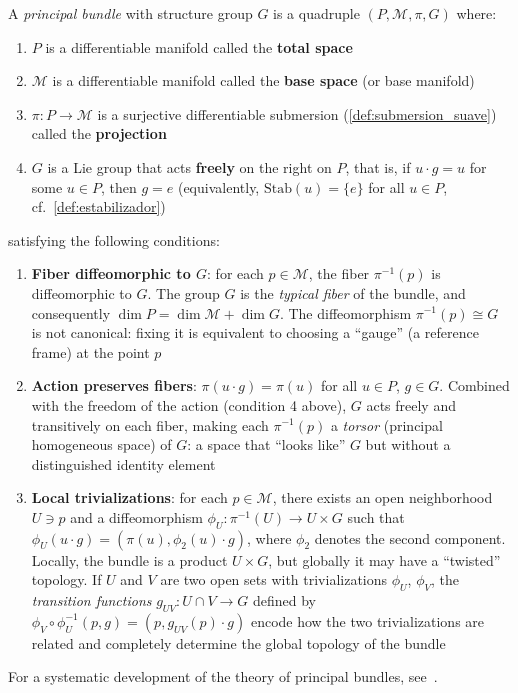 \begin{definition}\label{def:fibrado_principal_formal}
A \textit{principal bundle} with structure group $G$ is a quadruple $(P, \mathcal{M}, \pi, G)$ where:
\begin{enumerate}
    \item $P$ is a differentiable manifold called the \textbf{total space}
    \item $\mathcal{M}$ is a differentiable manifold called the \textbf{base space} (or base manifold)
    \item $\pi: P \to \mathcal{M}$ is a surjective differentiable submersion (\autoref{def:submersion_suave}) called the \textbf{projection}
    \item $G$ is a Lie group that acts \textbf{freely} on the right on $P$, that is, if $u \cdot g = u$ for some $u \in P$, then $g = e$ (equivalently, $\mathrm{Stab}(u) = \{e\}$ for all $u \in P$, cf.\ \autoref{def:estabilizador})
\end{enumerate}
satisfying the following conditions:
\begin{enumerate}
    \item[(a)] \textbf{Fiber diffeomorphic to $G$}: for each $p \in \mathcal{M}$, the fiber $\pi^{-1}(p)$ is diffeomorphic to $G$. The group $G$ is the \textit{typical fiber} of the bundle, and consequently $\dim P = \dim \mathcal{M} + \dim G$. The diffeomorphism $\pi^{-1}(p) \cong G$ is not canonical: fixing it is equivalent to choosing a ``gauge'' (a reference frame) at the point $p$

    \item[(b)] \textbf{Action preserves fibers}: $\pi(u \cdot g) = \pi(u)$ for all $u \in P$, $g \in G$. Combined with the freedom of the action (condition 4 above), $G$ acts freely and transitively on each fiber, making each $\pi^{-1}(p)$ a \textit{torsor} (principal homogeneous space) of $G$: a space that ``looks like'' $G$ but without a distinguished identity element

    \item[(c)] \textbf{Local trivializations}: for each $p \in \mathcal{M}$, there exists an open neighborhood $U \ni p$ and a diffeomorphism $\phi_U: \pi^{-1}(U) \to U \times G$ such that $\phi_U(u \cdot g) = (\pi(u), \phi_2(u) \cdot g)$, where $\phi_2$ denotes the second component. Locally, the bundle is a product $U \times G$, but globally it may have a ``twisted'' topology. If $U$ and $V$ are two open sets with trivializations $\phi_U$, $\phi_V$, the \textit{transition functions} $g_{UV}: U \cap V \to G$ defined by $\phi_V \circ \phi_U^{-1}(p, g) = (p, g_{UV}(p) \cdot g)$ encode how the two trivializations are related and completely determine the global topology of the bundle
\end{enumerate}
For a systematic development of the theory of principal bundles, see~\citep{Kobayashi1996}.
\end{definition}

